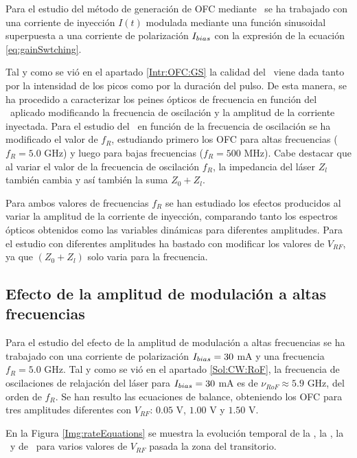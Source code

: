 
Para el estudio del m\'etodo de generaci\'on de OFC mediante \gs\ se ha trabajado con una corriente de inyecci\'on $I(t)$ modulada mediante una función sinusoidal superpuesta a una corriente de polarización $I_{bias}$ con la expresi\'on de la ecuación \ref{eq:gainSwtching}.

	Tal y como se vi\'o en el apartado \ref{Intr:OFC:GS} la calidad del \gs\ viene dada tanto por la intensidad de los picos como por la duraci\'on del pulso. De esta manera, se ha procedido a caracterizar los peines \'opticos de frecuencia en funci\'on del \gs\ aplicado modificando la frecuencia de oscilaci\'on y la amplitud de la corriente inyectada. Para el estudio del \gs\ en función de la frecuencia de oscilaci\'on se ha modificado el valor de $f_R$, estudiando primero los OFC para altas frecuencias ($f_R = 5.0$ GHz) y luego para bajas frecuencias ($f_R = 500$ MHz). Cabe destacar que al variar el valor de la frecuencia de oscilaci\'on $f_R$, la impedancia del l\'aser $Z_l$ tambi\'en cambia y as\'i también la suma $Z_0 + Z_l$.

	Para ambos valores de frecuencias $f_R$ se han estudiado los efectos producidos al variar la amplitud de la corriente de inyecci\'on, comparando tanto los espectros ópticos obtenidos como las variables dinámicas para diferentes amplitudes. Para el estudio con diferentes amplitudes ha bastado con modificar los valores de $V_{RF}$, ya que $(Z_0 + Z_l)$ solo varia para la frecuencia.

	\subsection{Efecto de la amplitud de modulación a altas frecuencias}
		\label{Sol:OFC:HgFreq}

		Para el estudio del efecto de la amplitud de modulación a altas frecuencias se ha trabajado con una corriente de polarización $I_{bias} = 30$ mA y una frecuencia $f_R = 5.0$ GHz. Tal y como se vi\'o en el apartado \ref{Sol:CW:RoF}, la frecuencia de oscilaciones de relajación del l\'aser para $I_{bias} = 30$ mA es de $\nu_{RoF} \approx 5.9$ GHz, del orden de $f_R$. Se han resulto las ecuaciones de balance, obteniendo los OFC para tres amplitudes diferentes con $V_{RF}$: $0.05$ V, $1.00$ V y $1.50$ V. 

		En la Figura \ref{Img:rateEquations} se muestra la evolución temporal de la \I, la \s, la \n\ y de \chirp\ para varios valores de $V_{RF}$ pasada la zona del transitorio.

